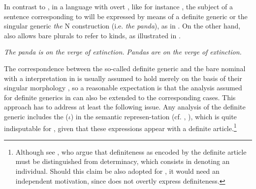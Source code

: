 \documentclass[output=paper
,modfonts
,nonflat]{langsci/langscibook}
\begin{document}
	In contrast to , in a language with overt , like for instance , the subject of a sentence corresponding to  will be expressed by means of a definite generic \citep{Carlson1977} or the singular generic \citep{Chierchia1998} \textit{the} N construction (i.e. \textit{the panda}), as in . On the other hand,  also allows bare plurals to refer to kinds, as illustrated in .
	
	\ea\label{ex:borik:2}
	\ea\label{ex:borik:2a}
	\textit{The panda is on the verge of extinction.}
	\ex\label{ex:borik:2b}
	\textit{Pandas are on the verge of extinction.}
	\z
	\z
	
	The correspondence between the so-called  definite generic and the  bare nominal with a  interpretation in  is usually assumed to hold merely on the basis of their singular  morphology \citep[cf.][]{Dayal2004}, so a reasonable expectation is that the analysis assumed for definite generics in  can also be extended to the corresponding  cases. This approach has to address at least the following issue. Any analysis of the  definite generic includes the  ($\iota$) in the semantic represen\hyp{}\linebreak\newpage\noindent tation (cf. \citealt{Chierchia1998}, \citealt{Dayal2004}), which is quite indisputable for , given that these expressions appear with a definite article.\footnote{Although see \citet{CoppockBeaver2015}, who argue that definiteness as encoded by the definite article must be distinguished from determinacy, which consists in denoting an individual. Should this claim be also adopted for , it would need an independent motivation, since  does not overtly express definiteness.}
	
\end{document}
